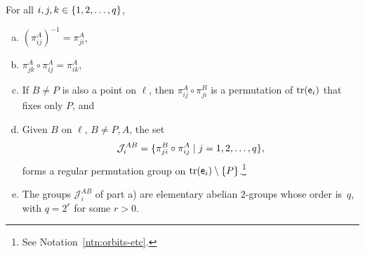 \begin{prop}\label{prop:pi_ij-properties}
    For all\/ $i,j,k\in\{1,2,\dots,q\}$,
    \begin{enumerate}[a),font=\upshape]
        \item $(\pi^A_{ij})^{-1} = \pi^A_{ji}$,
        \item $\pi^A_{jk}\circ\pi^A_{ij} = \pi^A_{ik}$,

        \item If\/ $B\ne P$ is also a point on\/ $\ell$, then\/ $\pi^A_{ij}\circ\pi^B_{ji}$ is a permutation of\/ $\operatorname{tr}(\mathsf e_i)$ that fixes only\/ $P$, and

        \item Given $B$ on $\ell$, $B\ne P,A$, the set
        \[
            \mathcal{J}^{AB}_i = \{\pi^B_{ji}\circ\pi^A_{ij}
                \mid j=1,2,\dots,q\},
        \]
        forms a regular permutation group on\/ $\operatorname{tr}(\mathsf e_i)\setminus\{P\}$.\footnote{See Notation~\ref{ntn:orbits-etc}.}
        \item The groups\/ $\mathcal J_i^{AB}$ of part\/ {\upshape a)} are elementary abelian\/ $2$-groups whose order is\/~$q$, with $q=2^r$ for some $r>0$.
    \end{enumerate}
\end{prop}

